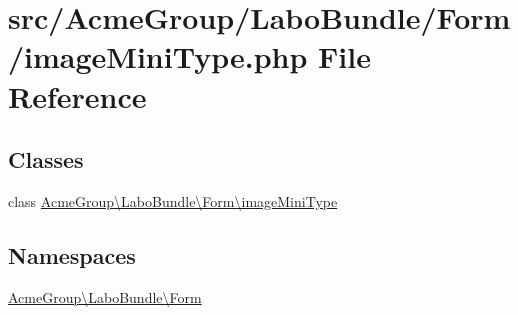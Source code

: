 \hypertarget{image_mini_type_8php}{\section{src/\+Acme\+Group/\+Labo\+Bundle/\+Form/image\+Mini\+Type.php File Reference}
\label{image_mini_type_8php}
}
\subsection*{Classes}
\begin{DoxyCompactItemize}
\item 
class \hyperlink{class_acme_group_1_1_labo_bundle_1_1_form_1_1image_mini_type}{Acme\+Group\textbackslash{}\+Labo\+Bundle\textbackslash{}\+Form\textbackslash{}image\+Mini\+Type}
\end{DoxyCompactItemize}
\subsection*{Namespaces}
\begin{DoxyCompactItemize}
\item 
 \hyperlink{namespace_acme_group_1_1_labo_bundle_1_1_form}{Acme\+Group\textbackslash{}\+Labo\+Bundle\textbackslash{}\+Form}
\end{DoxyCompactItemize}
